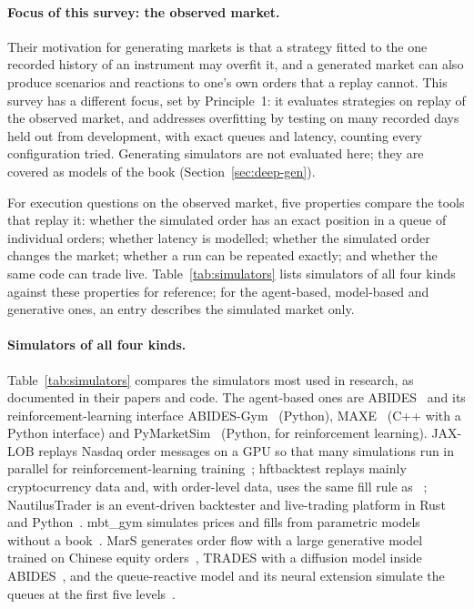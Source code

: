 \paragraph{Focus of this survey: the observed market.} Their motivation for generating markets is that a strategy
fitted to the one recorded history of an instrument may overfit it, and a generated market can also produce
scenarios and reactions to one's own orders that a replay cannot. This survey has a different focus, set by
Principle~1: it evaluates strategies on replay of the observed market, and addresses overfitting by testing on many
recorded days held out from development, with exact queues and latency, counting every configuration tried.
Generating simulators are not evaluated here; they are covered as models of the book (Section~\ref{sec:deep-gen}).

For execution questions on the observed market, five properties compare the tools that replay it: whether the simulated order has an exact position in a queue of individual orders; whether
latency is modelled; whether the simulated order changes the market; whether a run can be repeated exactly; and
whether the same code can trade live. Table~\ref{tab:simulators} lists simulators of all four kinds against these
properties for reference; for the agent-based, model-based and generative ones, an entry describes the simulated
market only.

\paragraph{Simulators of all four kinds.} Table~\ref{tab:simulators} compares the simulators most used in research,
as documented in their papers and code. The agent-based ones are ABIDES~\citep{byrd2020abides} and its
reinforcement-learning interface ABIDES-Gym~\citep{amrouni2021abidesgym} (Python), MAXE~\citep{belcak2022maxe} (C++ with
a Python interface) and PyMarketSim~\citep{mascioli2024pymarketsim} (Python, for reinforcement learning). JAX-LOB replays
Nasdaq order messages on a GPU so that many simulations run in parallel for reinforcement-learning
training~\citep{frey2023}; hftbacktest replays mainly cryptocurrency data and, with order-level data, uses the same fill
rule as \kasparhft{}~\citep{hftbacktest}; NautilusTrader is an event-driven backtester and live-trading platform in Rust and
Python~\citep{nautilustrader}. mbt\_gym simulates prices and fills from parametric models without a
book~\citep{jerome2023mbtgym}. MarS generates order flow with a large generative model trained on Chinese equity
orders~\citep{li2025mars}, TRADES with a diffusion model inside ABIDES~\citep{berti2025trades}, and the queue-reactive
model and its neural extension simulate the queues at the first five levels~\citep{huang2015,deepqr}.

